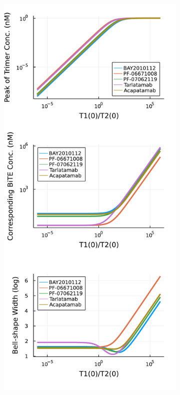 \begin{figure}
	\centering
	\begin{subfigure}[b]{0.48\textwidth}
		\centering
		\includegraphics[width=1\textwidth]{fig/compare-solid.pdf}

\end{subfigure}
\end{figure}
